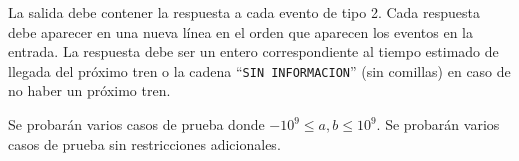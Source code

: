 \documentclass{oci}
\begin{document}
\begin{outputDescription}
  La salida debe contener la respuesta a cada evento de tipo 2.
  Cada respuesta debe aparecer en una nueva línea en el orden que aparecen
  los eventos en la entrada.
  La respuesta debe ser un entero correspondiente al tiempo estimado de llegada
  del próximo tren o la cadena ``\texttt{SIN INFORMACION}'' (sin comillas) en caso
  de no haber un próximo tren.
\end{outputDescription}

\begin{scoreDescription}
   Se probarán varios casos de prueba donde $-10^9\leq a, b \leq 10^9$.
   Se probarán varios casos de prueba sin restricciones adicionales.
\end{scoreDescription}

\begin{sampleDescription}
\end{sampleDescription}
\end{document}

